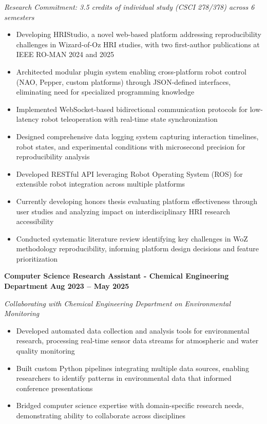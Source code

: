 \documentclass{article}
\begin{document}
\textit{Research Commitment: 3.5 credits of individual study (CSCI 278/378) across 6 semesters}
\begin{itemize}[noitemsep,topsep=2pt]
    \item Developing HRIStudio, a novel web-based platform addressing reproducibility challenges in Wizard-of-Oz HRI studies, with two first-author publications at IEEE RO-MAN 2024 and 2025
    \item Architected modular plugin system enabling cross-platform robot control (NAO, Pepper, custom platforms) through JSON-defined interfaces, eliminating need for specialized programming knowledge
    \item Implemented WebSocket-based bidirectional communication protocols for low-latency robot teleoperation with real-time state synchronization
    \item Designed comprehensive data logging system capturing interaction timelines, robot states, and experimental conditions with microsecond precision for reproducibility analysis
    \item Developed RESTful API leveraging Robot Operating System (ROS) for extensible robot integration across multiple platforms
    \item Currently developing honors thesis evaluating platform effectiveness through user studies and analyzing impact on interdisciplinary HRI research accessibility
    \item Conducted systematic literature review identifying key challenges in WoZ methodology reproducibility, informing platform design decisions and feature prioritization
\end{itemize}

 \hfill {}

\textbf{Computer Science Research Assistant - Chemical Engineering Department} \hfill \textbf{Aug 2023 – May 2025}

\textit{Collaborating with Chemical Engineering Department on Environmental Monitoring}
\begin{itemize}[noitemsep,topsep=2pt]
    \item Developed automated data collection and analysis tools for environmental research, processing real-time sensor data streams for atmospheric and water quality monitoring
    \item Built custom Python pipelines integrating multiple data sources, enabling researchers to identify patterns in environmental data that informed conference presentations
    \item Bridged computer science expertise with domain-specific research needs, demonstrating ability to collaborate across disciplines
\end{itemize}
\end{document}
